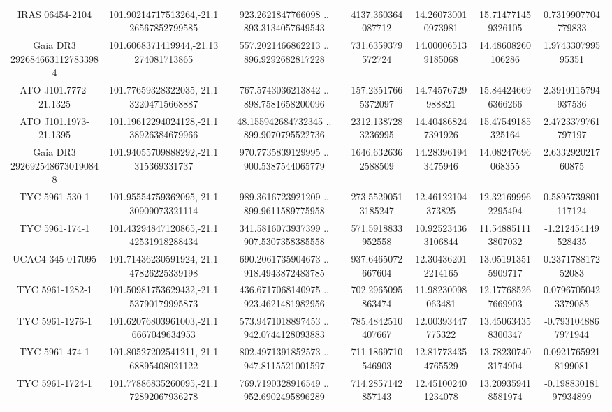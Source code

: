 \begin{table}
\begin{tabular}{ccccccc}
IRAS 06454-2104 & 101.90214717513264,-21.126567852799585 & 923.2621847766098 .. 893.3134057649543 & 4137.360364087712 & 14.260730010973981 & 15.714771459326105 & 0.7319907704779833 \\
Gaia DR3 2926846631127833984 & 101.6068371419944,-21.13274081713865 & 557.2021466862213 .. 896.9292682817228 & 731.6359379572724 & 14.000065139185068 & 14.48608260106286 & 1.974330799595351 \\
ATO J101.7772-21.1325 & 101.77659328322035,-21.132204715668887 & 767.5743036213842 .. 898.7581658200096 & 157.23517665372097 & 14.74576729988821 & 15.844246696366266 & 2.3910115794937536 \\
ATO J101.1973-21.1395 & 101.19612294024128,-21.138926384679966 & 48.155942684732345 .. 899.9070795522736 & 2312.1387283236995 & 14.404868247391926 & 15.47549185325164 & 2.4723379761797197 \\
Gaia DR3 2926925486730190848 & 101.94055709888292,-21.1315369331737 & 970.7735839129995 .. 900.5387544065779 & 1646.6326362588509 & 14.283961943475946 & 14.08247696068355 & 2.633292021760875 \\
TYC 5961-530-1 & 101.95554759362095,-21.130909073321114 & 989.3616723921209 .. 899.9611589775958 & 273.55290513185247 & 12.46122104373825 & 12.321699962295494 & 0.5895739801117124 \\
TYC 5961-174-1 & 101.43294847120865,-21.142531918288434 & 341.5816073937399 .. 907.5307358385558 & 571.5918833952558 & 10.925234363106844 & 11.548851113807032 & -1.212454149528435 \\
UCAC4 345-017095 & 101.71436230591924,-21.147826225339198 & 690.2061735904673 .. 918.4943872483785 & 937.6465072667604 & 12.304362012214165 & 13.051913515909717 & 0.237178817252083 \\
TYC 5961-1282-1 & 101.50981753629432,-21.153790179995873 & 436.6717068140975 .. 923.4621481982956 & 702.2965095863474 & 11.98230098063481 & 12.177685267669903 & 0.07967050423379085 \\
TYC 5961-1276-1 & 101.62076803961003,-21.16667049634953 & 573.9471018897453 .. 942.0744128093883 & 785.4842510407667 & 12.00393447775322 & 13.450634358300347 & -0.7931048867971944 \\
TYC 5961-474-1 & 101.80527202541211,-21.168895408021122 & 802.4971391852573 .. 947.8115521001597 & 711.1869710546903 & 12.817734354765529 & 13.782307403174904 & 0.09217659218199081 \\
TYC 5961-1724-1 & 101.77886835260095,-21.172892067936278 & 769.7190328916549 .. 952.6902495896289 & 714.2857142857143 & 12.451002401234078 & 13.209359418581974 & -0.19883018197934899 \\

\end{tabular}
\end{table}
